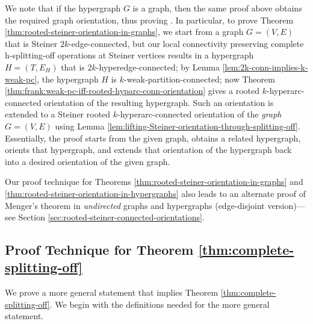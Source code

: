 We note that if the hypergraph $G$ is a graph, then the same proof above obtains the required graph orientation, thus proving .
In particular, to prove Theorem \ref{thm:rooted-steiner-orientation-in-graphs}, we start from a graph $G=(V, E)$ that is Steiner $2k$-edge-connected, but our local connectivity preserving complete h-splitting-off operations at Steiner vertices results in a hypergraph $H=(T, E_H)$ that is $2k$-hyperedge-connected; by Lemma \ref{lem:2k-conn-implies-k-weak-pc}, the hypergraph $H$ is $k$-weak-partition-connected; now Theorem \ref{thm:frank:weak-pc-iff-rooted-hyparc-conn-orientation} gives a rooted $k$-hyperarc-connected orientation of the resulting hypergraph. Such an orientation is extended to a  Steiner rooted $k$-hyperarc-connected orientation of the \emph{graph} $G=(V, E)$ using Lemma \ref{lem:lifting-Steiner-orientation-through-splitting-off}. Essentially, the proof starts from the given graph, obtains a related hypergraph, orients that hypergraph, and extends that orientation of the hypergraph back into a desired orientation of the given graph. 

Our proof technique for Theorems \ref{thm:rooted-steiner-orientation-in-graphs} and \ref{thm:rooted-steiner-orientation-in-hypergraphs} also leads to an alternate proof of Menger's theorem in \emph{undirected} graphs and hypergraphs (edge-disjoint version)---see Section \ref{sec:rooted-steiner-connected-orientations}. 

\subsection{Proof Technique for Theorem \ref{thm:complete-splitting-off}}
We prove a more general statement that implies Theorem \ref{thm:complete-splitting-off}. We begin with the definitions needed for the more general statement. 

